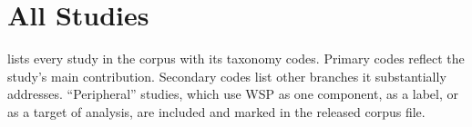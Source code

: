 \section{All Studies}
\label{app:table}

 lists every study in the corpus with its taxonomy codes. Primary codes reflect the study's main contribution. Secondary codes list other branches it substantially addresses. ``Peripheral'' studies, which use WSP as one component, as a label, or as a target of analysis, are included and marked in the released corpus file.


